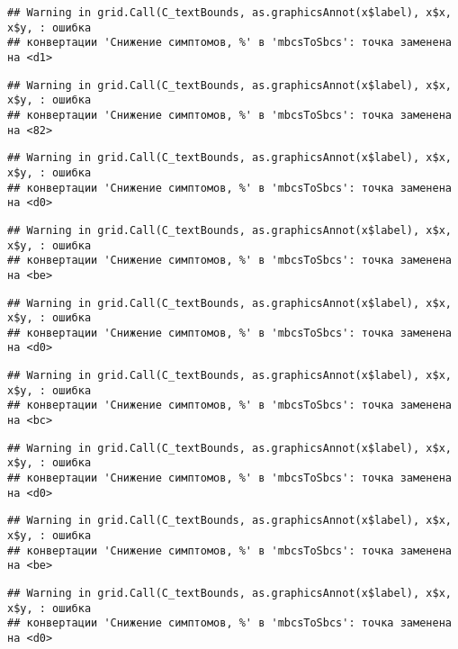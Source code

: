 \documentclass[
]{article}
\begin{document}
\begin{verbatim}
## Warning in grid.Call(C_textBounds, as.graphicsAnnot(x$label), x$x, x$y, : ошибка
## конвертации 'Снижение симптомов, %' в 'mbcsToSbcs': точка заменена на <d1>
\end{verbatim}

\begin{verbatim}
## Warning in grid.Call(C_textBounds, as.graphicsAnnot(x$label), x$x, x$y, : ошибка
## конвертации 'Снижение симптомов, %' в 'mbcsToSbcs': точка заменена на <82>
\end{verbatim}

\begin{verbatim}
## Warning in grid.Call(C_textBounds, as.graphicsAnnot(x$label), x$x, x$y, : ошибка
## конвертации 'Снижение симптомов, %' в 'mbcsToSbcs': точка заменена на <d0>
\end{verbatim}

\begin{verbatim}
## Warning in grid.Call(C_textBounds, as.graphicsAnnot(x$label), x$x, x$y, : ошибка
## конвертации 'Снижение симптомов, %' в 'mbcsToSbcs': точка заменена на <be>
\end{verbatim}

\begin{verbatim}
## Warning in grid.Call(C_textBounds, as.graphicsAnnot(x$label), x$x, x$y, : ошибка
## конвертации 'Снижение симптомов, %' в 'mbcsToSbcs': точка заменена на <d0>
\end{verbatim}

\begin{verbatim}
## Warning in grid.Call(C_textBounds, as.graphicsAnnot(x$label), x$x, x$y, : ошибка
## конвертации 'Снижение симптомов, %' в 'mbcsToSbcs': точка заменена на <bc>
\end{verbatim}

\begin{verbatim}
## Warning in grid.Call(C_textBounds, as.graphicsAnnot(x$label), x$x, x$y, : ошибка
## конвертации 'Снижение симптомов, %' в 'mbcsToSbcs': точка заменена на <d0>
\end{verbatim}

\begin{verbatim}
## Warning in grid.Call(C_textBounds, as.graphicsAnnot(x$label), x$x, x$y, : ошибка
## конвертации 'Снижение симптомов, %' в 'mbcsToSbcs': точка заменена на <be>
\end{verbatim}

\begin{verbatim}
## Warning in grid.Call(C_textBounds, as.graphicsAnnot(x$label), x$x, x$y, : ошибка
## конвертации 'Снижение симптомов, %' в 'mbcsToSbcs': точка заменена на <d0>
\end{verbatim}
\end{document}
